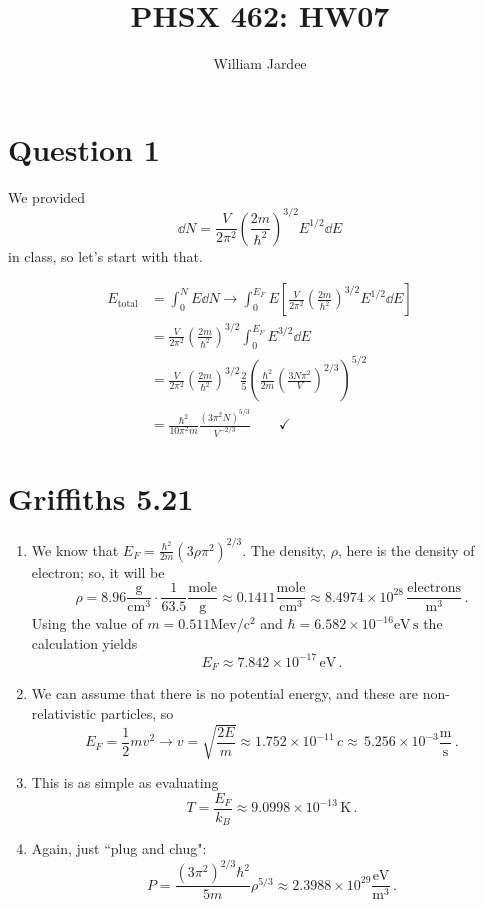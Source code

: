 \documentclass[11pt]{article}
\begin{document}
\title{PHSX 462: HW07}
\author{William Jardee}
\maketitle


\section*{Question 1}
We provided 
\[\dd{N} = \frac{V}{2\pi^2}\left(\frac{2m}{\hbar^2}\right)^{3/2}E^{1/2}\dd{E}\]
in class, so let's start with that.

\begin{align*}
E_{\text{total}} & = \int_0^N E\dd{N} \rightarrow \int_0^{E_F} E \left[\frac{V}{2\pi^2}\left(\frac{2m}{\hbar^2}\right)^{3/2}E^{1/2}\dd{E}\right]\\
& = \frac{V}{2\pi^2}\left(\frac{2m}{\hbar^2}\right)^{3/2}\int_0^{E_F}E^{3/2}\dd{E}\\
& = \frac{V}{2\pi^2}\left(\frac{2m}{\hbar^2}\right)^{3/2}\frac{2}{5}\left(\frac{\hbar^2}{2m}\left(\frac{3N\pi^2}{V}\right)^{2/3}\right)^{5/2}\\
& = \frac{\hbar^2}{10\pi^2m}\frac{(3\pi^2N)^{5/3}}{V^{-2/3}} \qquad \checkmark
\end{align*}

\newpage

\section*{Griffiths 5.21}
\begin{enumerate}[label=\alph*)]
\item We know that $\displaystyle{E_F = \frac{\hbar^2}{2m}\left(3\rho\pi^2\right)^{2/3}}$. The density, $\rho$, here is the density of electron; so, it will be
\[\rho = 8.96 \frac{\text{g}}{\text{cm}^3} \cdot \frac{1}{63.5}\frac{\text{mole}}{\text{g}} \approx 0.1411 \frac{\text{mole}}{\text{cm}^3} \approx \boxed{8.4974 \times 10^{28}\, \frac{\text{electrons}}{\text{m}^3}}\,.\] 
Using the value of $m = 0.511 \text{Mev}/\text{c}^2$ and $\hbar = 6.582 \times 10^{-16} \text{eV}\, \text{s}$ the calculation yields
\[\boxed{E_F \approx 7.842 \times 10^{-17} \, \text{eV}}\,.\]

\item We can assume that there is no potential energy, and these are non-relativistic particles, so 
\[E_F = \frac{1}{2}mv^2 \rightarrow v = \sqrt{\frac{2E}{m}} \approx 1.752 \times 10^{-11} \, c \approx \, \boxed{5.256 \times 10^{-3} \frac{\text{m}}{\text{s}}}\,.\]

\item This is as simple as evaluating 
\[T = \frac{E_F}{k_B} \approx \boxed{9.0998\times 10^{-13}\,\text{K}}\,.\]

\item Again, just ``plug and chug":
\[P = \frac{\left(3\pi^2\right)^{2/3}\hbar^2}{5m}\rho^{5/3} \approx \boxed{2.3988 \times 10^{29} \frac{\text{eV}}{\text{m}^3}}\,.\]
\end{enumerate}
\end{document}
